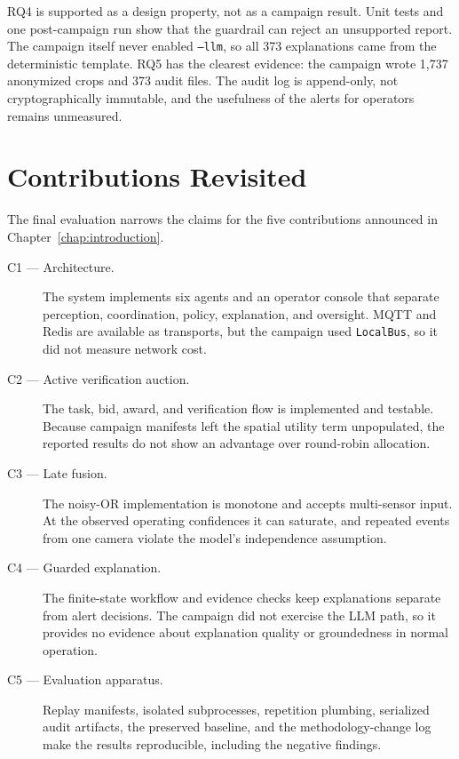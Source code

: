 RQ4 is supported as a design property, not as a campaign result. Unit tests
and one post-campaign run show that the guardrail can reject an unsupported
report. The campaign itself never enabled \texttt{--llm}, so all 373
explanations came from the deterministic template. RQ5 has the clearest
evidence: the campaign wrote 1,737 anonymized crops and 373 audit files. The
audit log is append-only, not cryptographically immutable, and the usefulness
of the alerts for operators remains unmeasured.

\section{Contributions Revisited}

The final evaluation narrows the claims for the five contributions announced
in Chapter~\ref{chap:introduction}.

\begin{description}
    \item[C1 --- Architecture.] The system implements six agents and an
    operator console that separate perception, coordination, policy,
    explanation, and oversight. MQTT and Redis are available as transports,
    but the campaign used \texttt{LocalBus}, so it did not measure network
    cost.

    \item[C2 --- Active verification auction.] The task, bid, award, and
    verification flow is implemented and testable. Because campaign manifests
    left the spatial utility term unpopulated, the reported results do not show
    an advantage over round-robin allocation.

    \item[C3 --- Late fusion.] The noisy-OR implementation is monotone and
    accepts multi-sensor input. At the observed operating confidences it can
    saturate, and repeated events from one camera violate the model's
    independence assumption.

    \item[C4 --- Guarded explanation.] The finite-state workflow and evidence
    checks keep explanations separate from alert decisions. The campaign did
    not exercise the LLM path, so it provides no evidence about explanation
    quality or groundedness in normal operation.

    \item[C5 --- Evaluation apparatus.] Replay manifests, isolated
    subprocesses, repetition plumbing, serialized audit artifacts, the
    preserved baseline, and the methodology-change log make the results
    reproducible, including the negative findings.
\end{description}

